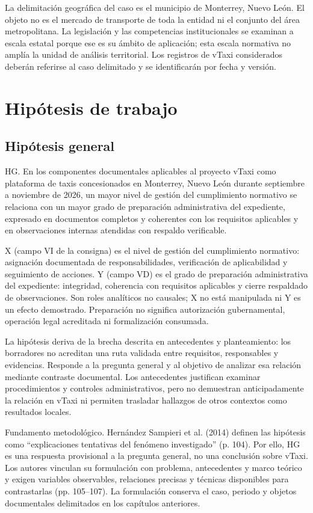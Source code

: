 {La delimitación geográfica del caso es el municipio de Monterrey, Nuevo León. El objeto no es el mercado de transporte de toda la entidad ni el conjunto del área metropolitana. La legislación y las competencias institucionales se examinan a escala estatal porque ese es su ámbito de aplicación; esta escala normativa no amplía la unidad de análisis territorial. Los registros de vTaxi considerados deberán referirse al caso delimitado y se identificarán por fecha y versión.


\section{Hipótesis de trabajo}
\subsection{Hipótesis general}
HG. En los componentes documentales aplicables al proyecto vTaxi como plataforma de taxis concesionados en Monterrey, Nuevo León durante septiembre a noviembre de 2026, un mayor nivel de gestión del cumplimiento normativo se relaciona con un mayor grado de preparación administrativa del expediente, expresado en documentos completos y coherentes con los requisitos aplicables y en observaciones internas atendidas con respaldo verificable.


X (campo VI de la consigna) es el nivel de gestión del cumplimiento normativo: asignación documentada de responsabilidades, verificación de aplicabilidad y seguimiento de acciones. Y (campo VD) es el grado de preparación administrativa del expediente: integridad, coherencia con requisitos aplicables y cierre respaldado de observaciones. Son roles analíticos no causales; X no está manipulada ni Y es un efecto demostrado. Preparación no significa autorización gubernamental, operación legal acreditada ni formalización consumada.


La hipótesis deriva de la brecha descrita en antecedentes y planteamiento: los borradores no acreditan una ruta validada entre requisitos, responsables y evidencias. Responde a la pregunta general y al objetivo de analizar esa relación mediante contraste documental. Los antecedentes justifican examinar procedimientos y controles administrativos, pero no demuestran anticipadamente la relación en vTaxi ni permiten trasladar hallazgos de otros contextos como resultados locales.


Fundamento metodológico. Hernández Sampieri et al. (2014) definen las hipótesis como “explicaciones tentativas del fenómeno investigado” (p. 104). Por ello, HG es una respuesta provisional a la pregunta general, no una conclusión sobre vTaxi. Los autores vinculan su formulación con problema, antecedentes y marco teórico y exigen variables observables, relaciones precisas y técnicas disponibles para contrastarlas (pp. 105–107). La formulación conserva el caso, periodo y objetos documentales delimitados en los capítulos anteriores.


}

